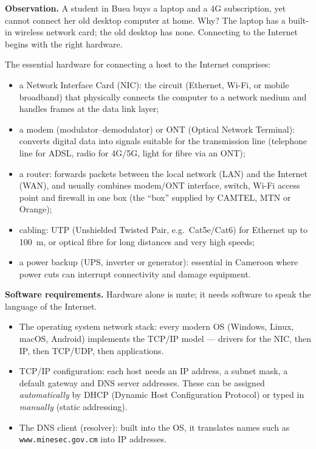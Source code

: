 \documentclass[11pt]{article}
\newcommand{\cle}[1]{{\popxbold\color{popdark}#1}}
\begin{document}
\textbf{Observation.} A student in Buea buys a laptop and a 4G subscription, yet cannot connect her old desktop computer at home. Why? The laptop has a built-in wireless network card; the old desktop has none. Connecting to the Internet begins with the right \cle{hardware}.

\begin{definition}
The essential hardware for connecting a host to the Internet comprises:
\begin{itemize}
\item a \cle{Network Interface Card} (NIC): the circuit (Ethernet, Wi-Fi, or mobile broadband) that physically connects the computer to a network medium and handles frames at the data link layer;
\item a \cle{modem} (modulator--demodulator) or \cle{ONT} (Optical Network Terminal): converts digital data into signals suitable for the transmission line (telephone line for ADSL, radio for 4G/5G, light for fibre via an ONT);
\item a \cle{router}: forwards packets between the local network (LAN) and the Internet (WAN), and usually combines modem/ONT interface, switch, Wi-Fi access point and firewall in one box (the ``box'' supplied by CAMTEL, MTN or Orange);
\item \cle{cabling}: UTP (Unshielded Twisted Pair, e.g.\ Cat5e/Cat6) for Ethernet up to \SI{100}{m}, or optical fibre for long distances and very high speeds;
\item a \cle{power backup} (UPS, inverter or generator): essential in Cameroon where power cuts can interrupt connectivity and damage equipment.
\end{itemize}
\end{definition}

\textbf{Software requirements.} Hardware alone is mute; it needs software to speak the language of the Internet.

\begin{itemize}
\item The \cle{operating system network stack}: every modern OS (Windows, Linux, macOS, Android) implements the TCP/IP model --- drivers for the NIC, then IP, then TCP/UDP, then applications.
\item \cle{TCP/IP configuration}: each host needs an IP address, a subnet mask, a default gateway and DNS server addresses. These can be assigned \emph{automatically} by \cle{DHCP} (Dynamic Host Configuration Protocol) or typed in \emph{manually} (static addressing).
\item The \cle{DNS client} (resolver): built into the OS, it translates names such as \texttt{www.minesec.gov.cm} into IP addresses.
\end{itemize}
\end{document}
